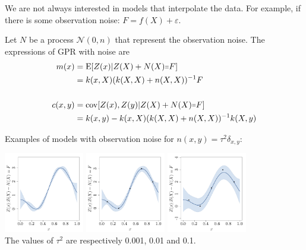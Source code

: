 \begin{frame}{}
We are not always interested in models that interpolate the data. For example, if there is some observation noise: $F = f(X) + \varepsilon$.

\vspace{5mm}
Let $N$ be a process $\mathcal{N}(0,n)$ that represent the observation noise. The expressions of GPR with noise are
\begin{equation*}
	\begin{split}
	m(x) &= \E[Z(x)|Z(X) + N(X) \shorteq F] \\
	&= k(x,X) (k(X,X)+n(X,X))^{-1} F \\
	& \\
	c(x,y) &= \Cov[Z(x),Z(y)|Z(X)+ N(X) \shorteq F] \\
	&= k(x,y) - k(x,X) (k(X,X)+n(X,X))^{-1} k(X,y)
\end{split}
\end{equation*}
\end{frame}

\begin{frame}{}
Examples of models with observation noise for $n(x,y)=\tau^2 \delta_{x,y}$:
\begin{center}
\includegraphics[height=3.5cm]{1_stat_models/figures/R/ch34_GPRnoise0001}
\includegraphics[height=3.5cm]{1_stat_models/figures/R/ch34_GPRnoise001}
\includegraphics[height=3.5cm]{1_stat_models/figures/R/ch34_GPRnoise01}\\
The values of $\tau^2$ are respectively 0.001, 0.01 and 0.1.
\end{center}
\end{frame}


